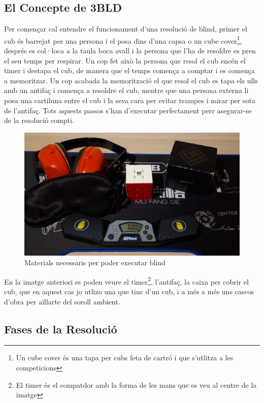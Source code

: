 \vspace{5cm}
\subsection{El Concepte de 3BLD}

Per començar cal entendre el funcionament d'una resolució de blind, primer el cub és barrejat per una persona i el posa dins d'una capsa o un cube cover\footnote{Un cube cover és una tapa per cubs feta de cartró i que s'utlitza a les competicions}, després es col·loca a la taula boca avall i la persona que l'ha de resoldre es pren el seu temps per respirar. 
Un cop fet això la persona que resol el cub encén el timer i destapa el cub, de manera que el temps comença a comptar i es comença a memoritzar. Un cop acabada la memorització el que resol el cub es tapa els ulls amb un antifaç i comença a resoldre el cub, mentre que una persona externa li posa una cartiluna entre el cub i la seva cara per evitar trampes i mirar per sota de l'antifaç.
Tots aquests passos s'han d'executar perfectament perr asegurar-se de la resolució compti.

\begin{figure}[ht]
    \centering
    \includegraphics[width=12cm]{img/figures/materials-bld.jpg}
\caption{Materials necessaris per poder executar blind}
    \label{fig:materials-bld}
\end{figure}

En la imatge anteriori es poden veure el timer\footnote{El timer és el compatdor amb la forma de les mans que es veu al centre de la imatge}, l'antifaç, la caixa per cobrir el cub, que en aquest cas jo utlizo una que tinc d'un cub, i a més a més uns cascos d'obra per aïllarte del soroll ambient.

\vspace{0.5cm}
\subsection{Fases de la Resolució}

